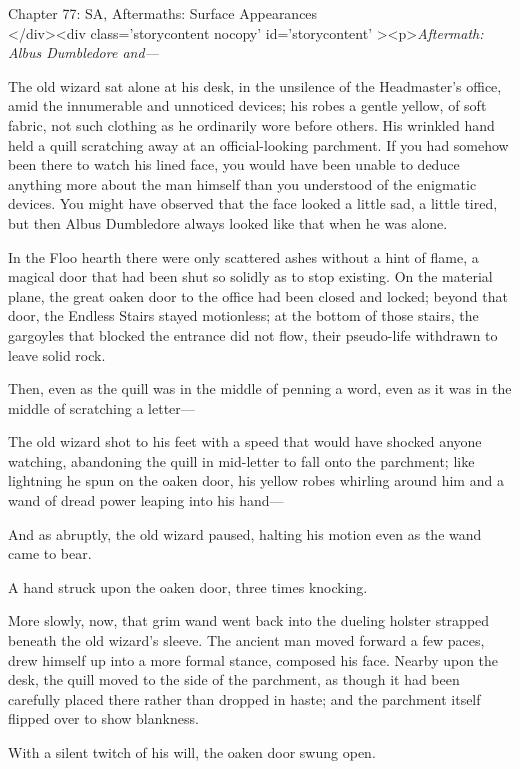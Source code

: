 
Chapter 77: SA, Aftermaths: Surface Appearances\\
</div><div  class='storycontent nocopy' id='storycontent' ><p>\emph{Aftermath: 
Albus Dumbledore and---}

The old wizard sat alone at his desk, in the unsilence of the Headmaster's 
office, amid the innumerable and unnoticed devices; his robes a gentle yellow, 
of soft fabric, not such clothing as he ordinarily wore before others. His 
wrinkled hand held a quill scratching away at an official-looking parchment. If 
you had somehow been there to watch his lined face, you would have been unable 
to deduce anything more about the man himself than you understood of the 
enigmatic devices. You might have observed that the face looked a little sad, a 
little tired, but then Albus Dumbledore always looked like that when he was 
alone.

In the Floo hearth there were only scattered ashes without a hint of flame, a 
magical door that had been shut so solidly as to stop existing. On the material 
plane, the great oaken door to the office had been closed and locked; beyond 
that door, the Endless Stairs stayed motionless; at the bottom of those stairs, 
the gargoyles that blocked the entrance did not flow, their pseudo-life 
withdrawn to leave solid rock.

Then, even as the quill was in the middle of penning a word, even as it was in 
the middle of scratching a letter---

The old wizard shot to his feet with a speed that would have shocked anyone 
watching, abandoning the quill in mid-letter to fall onto the parchment; like 
lightning he spun on the oaken door, his yellow robes whirling around him and a 
wand of dread power leaping into his hand---

And as abruptly, the old wizard paused, halting his motion even as the wand 
came to bear.

A hand struck upon the oaken door, three times knocking.

More slowly, now, that grim wand went back into the dueling holster strapped 
beneath the old wizard's sleeve. The ancient man moved forward a few paces, 
drew himself up into a more formal stance, composed his face. Nearby upon the 
desk, the quill moved to the side of the parchment, as though it had been 
carefully placed there rather than dropped in haste; and the parchment itself 
flipped over to show blankness.

With a silent twitch of his will, the oaken door swung open.

